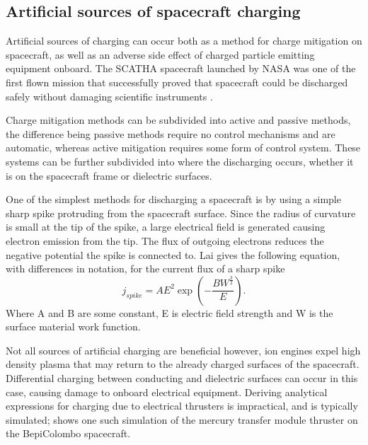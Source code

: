 \subsection*{Artificial sources of spacecraft charging}
Artificial sources of charging can occur both as a method for charge mitigation on spacecraft, as well as an adverse side effect of charged particle emitting equipment onboard. The SCATHA spacecraft launched by NASA was one of the first flown mission that successfully proved that spacecraft could be discharged safely without damaging scientific instruments  \parencite{Wade}. 

Charge mitigation methods can be subdivided into active and passive methods, the difference being passive methods require no control mechanisms and are automatic, whereas active mitigation requires some form of control system. These systems can be further subdivided into where the discharging occurs, whether it is on the spacecraft frame or dielectric surfaces.

One of the simplest methods for discharging a spacecraft is by using a simple sharp spike protruding from the spacecraft surface. Since the radius of curvature is small at the tip of the spike, a large electrical field is generated causing electron emission from the tip. The flux of outgoing electrons reduces the negative potential the spike is connected to. Lai \parencite{Lai2003} gives the following equation, with differences in notation, for the current flux of a sharp spike 
\begin{equation}
    j_{spike} = A E^2 \exp \left(- \frac{B W^{\frac{3}{2}}}{E} \right).
\end{equation}
Where A and B are some constant, E is electric field strength and W is the surface material work function.

Not all sources of artificial charging are beneficial however, ion engines expel high density plasma that may return to the already charged surfaces of the spacecraft. Differential charging between conducting and dielectric surfaces can occur in this case, causing damage to onboard electrical equipment. Deriving analytical expressions for charging due to electrical thrusters is impractical, and is typically simulated; \parencite{ESA} shows one such simulation of the mercury transfer module thruster on the BepiColombo spacecraft. 